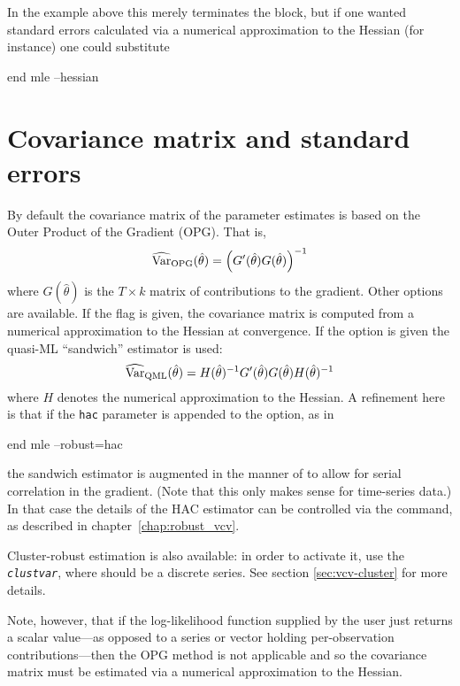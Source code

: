 In the example above this merely terminates the block, but if one
wanted standard errors calculated via a numerical approximation to the
Hessian (for instance) one could substitute
\begin{code}
end mle --hessian
\end{code}

\section{Covariance matrix and standard errors}
\label{sec:ml-vcv}

By default the covariance matrix of the parameter estimates is
based on the Outer Product of the Gradient (OPG).  That is,
\begin{equation}
  \label{eq:OPGmat}
  \widehat{\mbox{Var}}_{\mbox{\scriptsize OPG}}(\hat{\theta}) =
  \left(G'(\hat{\theta}) G(\hat{\theta}) \right)^{-1}
\end{equation}
where $G(\hat{\theta})$ is the $T \times k$ matrix of contributions to
the gradient.  Other options are available.  If the 
flag is given, the covariance matrix is computed from a numerical
approximation to the Hessian at convergence.  If the 
option is given the quasi-ML ``sandwich'' estimator is used:
\[
\widehat{\mbox{Var}}_{\mbox{\scriptsize QML}}(\hat{\theta}) = H(\hat{\theta})^{-1}
  G'(\hat{\theta}) G(\hat{\theta}) H(\hat{\theta})^{-1}
\]
where $H$ denotes the numerical approximation to the Hessian. A
refinement here is that if the \texttt{hac} parameter is appended to
the  option, as in
\begin{code}
end mle --robust=hac
\end{code}
the sandwich estimator is augmented in the manner of
\cite{newey-west87} to allow for serial correlation in the
gradient. (Note that this only makes sense for time-series data.) In
that case the details of the HAC estimator can be controlled via the
 command, as described in chapter~\ref{chap:robust_vcv}.

Cluster-robust estimation is also available: in order to activate it,
use the \emph{\texttt{clustvar}}, where 
should be a discrete series. See section \ref{sec:vcv-cluster} for
more details.

Note, however, that if the log-likelihood function supplied by the
user just returns a scalar value---as opposed to a series or vector
holding per-observation contributions---then the OPG method is not
applicable and so the covariance matrix must be estimated via a
numerical approximation to the Hessian.

